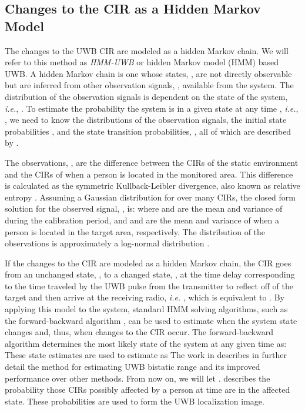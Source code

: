 \documentclass[conference]{IEEEtran}
\begin{document}
\subsection{Changes to the CIR as a Hidden Markov Model} \label{sec:uwb_hmm}

The changes to the UWB CIR are modeled as a hidden Markov chain. We
will refer to this method as \emph{HMM-UWB} or hidden Markov model
(HMM) based UWB. A hidden Markov chain is one whose states, ,
are not directly observable but are inferred from other observation
signals, , available from the system. The distribution of the
observation signals is dependent on the state of the system,
\emph{i.e.}, . To estimate the probability the
system is in a given state at any time , \emph{i.e.},
, we need to know the distributions of
the observation signals, the initial state probabilities , and
the state transition probabilities, , all of which are
described by 
\cite{Rabiner}.

The observations, , are the difference between the CIRs of the
static environment and the CIRs of when a person is located in the
monitored area. This difference is calculated as the symmetric
Kullback-Leibler divergence, also known as relative entropy
\cite{Cover}. Assuming a Gaussian distribution for  over many
CIRs, the closed form solution for the observed signal, , is:
 where  and  are the mean and
variance of  during the calibration period, and  and  are the mean and variance of  when a person is
located in the target area, respectively. The distribution of the
observations is approximately a log-normal distribution \cite{Wisnet}.

If the changes to the CIR are modeled as a hidden Markov chain, the
CIR goes from an unchanged state, , to a changed state, , at
the time delay corresponding to the time traveled by the UWB pulse
from the transmitter to reflect off of the target and then arrive at
the receiving radio, \emph{i.e.} , which is equivalent to
. By applying this model to the system, standard HMM solving
algorithms, such as the forward-backward algorithm \cite{Rabiner}, can
be used to estimate when the system state changes and, thus, when
changes to the CIR occur. The forward-backward algorithm determines
the most likely state of the system at any given time as:
 These state estimates are used to estimate  as
 The work in \cite{McCracken} describes in further
detail the method for estimating UWB bistatic range and its improved
performance over other methods. From now on, we will let .  describes the probability
those CIRs possibly affected by a person at time  are in the
affected state. These probabilities are used to form the UWB
localization image.
\end{document}
